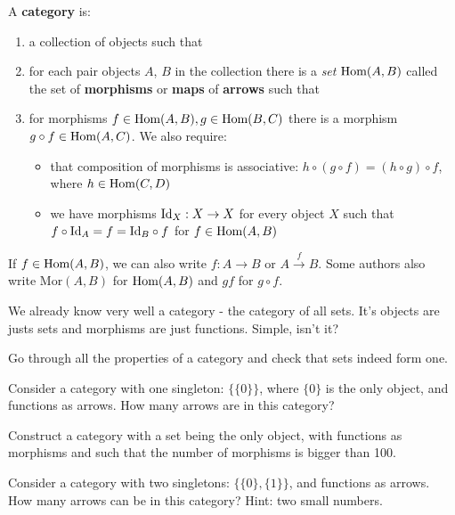 \begin{definition}
  A \textbf{category} is:
  \begin{enumerate}
    \item a collection of objects such that
    \item for each pair objects $A$, $B$ in the collection there is a \emph{set} $\text{Hom}(A,B)$ called the set of \textbf{morphisms} or \textbf{maps} of \textbf{arrows} such that
    \item for morphisms $f\in \text{Hom}(A,B), g\in \text{Hom}(B,C)$ there is a morphism $g\circ f\in \text{Hom}(A,C)$. We also require:
      \begin{itemize}
        \item that composition of morphisms is associative: $h\circ(g\circ f)=(h\circ g)\circ f$, where $h\in \text{Hom}(C, D)$
        \item we have morphisms $\text{Id}_X: X\to X$ for every object $X$ such that $f\circ\text{Id}_A = f=\text{Id}_B\circ f$ for $f\in \text{Hom}(A,B)$
      \end{itemize}
  \end{enumerate}
  If $f\in \text{Hom}(A,B)$, we can also write $f:A\to B$ or $A\xrightarrow{f} B$. Some authors also write $\text{Mor}(A,B)$ for $\text{Hom}(A,B)$ and $gf$ for $g\circ f$.
\end{definition}

\begin{example}
  We already know very well a category - the category of all sets. It's objects are justs sets and morphisms are just functions. Simple, isn't it?
\end{example}

\begin{exercise}
  Go through all the properties of a category and check that sets indeed form one.
\end{exercise}

\begin{exercise}
  Consider a category with one singleton: $\{\{0\}\}$, where $\{0\}$ is the only object, and functions as arrows. How many arrows are in this category?
\end{exercise}

\begin{exercise}
  Construct a category with a set being the only object, with functions as morphisms and such that the number of morphisms is bigger than 100.
\end{exercise}

\begin{exercise}
  Consider a category with two singletons: $\{\{0\}, \{1\}\}$, and functions as arrows. How many arrows can be in this category? Hint: two small numbers.
\end{exercise}

\subsection{}

